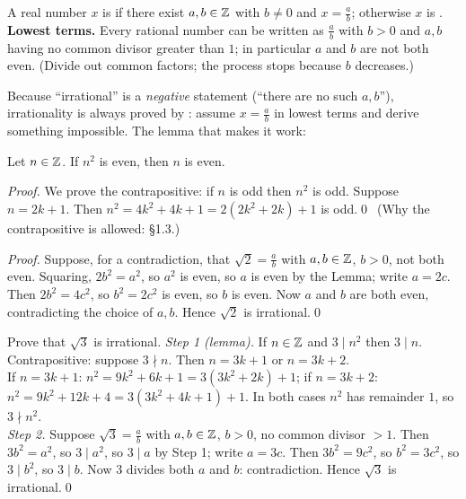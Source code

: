 
\begin{key}
A real number $x$ is  if there exist $a,b\in\mathbb{Z}$ with $b\neq0$ and $x=\frac ab$; otherwise $x$ is .\\
\textbf{Lowest terms.} Every rational number can be written as $\frac ab$ with $b>0$ and $a,b$ having no common divisor greater than $1$; in particular $a$ and $b$ are not both even. (Divide out common factors; the process stops because $b$ decreases.)
\end{key}

Because ``irrational'' is a \emph{negative} statement (``there are no such $a,b$''), irrationality is always proved by : assume $x=\frac ab$ in lowest terms and derive something impossible. The lemma that makes it work:

\begin{result}[Lemma]
Let $n\in\mathbb{Z}$. If $n^2$ is even, then $n$ is even.
\end{result}
\emph{Proof.} We prove the contrapositive: if $n$ is odd then $n^2$ is odd. Suppose $n=2k+1$. Then $n^2=4k^2+4k+1=2(2k^2+2k)+1$ is odd.\qed\ (Why the contrapositive is allowed: \S1.3.)

\begin{result}
\end{result}
\emph{Proof.} Suppose, for a contradiction, that $\sqrt2=\frac ab$ with $a,b\in\mathbb{Z}$, $b>0$, not both even. Squaring, $2b^2=a^2$, so $a^2$ is even, so $a$ is even by the Lemma; write $a=2c$. Then $2b^2=4c^2$, so $b^2=2c^2$ is even, so $b$ is even. Now $a$ and $b$ are both even, contradicting the choice of $a,b$. Hence $\sqrt2$ is irrational.\qed

\begin{hexample}
Prove that $\sqrt3$ is irrational.
\solution
\emph{Step 1 (lemma).} If $n\in\mathbb{Z}$ and $3\mid n^2$ then $3\mid n$. Contrapositive: suppose $3\nmid n$. Then $n=3k+1$ or $n=3k+2$.\\
If $n=3k+1$: $n^2=9k^2+6k+1=3(3k^2+2k)+1$; if $n=3k+2$: $n^2=9k^2+12k+4=3(3k^2+4k+1)+1$. In both cases $n^2$ has remainder $1$, so $3\nmid n^2$.\\
\emph{Step 2.} Suppose $\sqrt3=\frac ab$ with $a,b\in\mathbb{Z}$, $b>0$, no common divisor $>1$. Then $3b^2=a^2$, so $3\mid a^2$, so $3\mid a$ by Step 1; write $a=3c$. Then $3b^2=9c^2$, so $b^2=3c^2$, so $3\mid b^2$, so $3\mid b$. Now $3$ divides both $a$ and $b$: contradiction. Hence $\sqrt3$ is irrational.\qed
\end{hexample}

